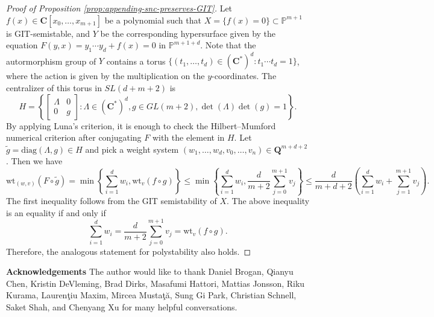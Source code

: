 \documentclass[letterpaper,11pt]{amsart}
\theoremstyle{plain}
\theoremstyle{definition}
\theoremstyle{remark}
\newcommand{\PP}{\mathbb{P}}
\newcommand{\QQ}{\mathbf{Q}}
\newcommand{\CC}{\mathbf{C}}
\newcommand{\sta}{^{*}}
\begin{document}
    \begin{proof}[Proof of Proposition \ref{prop:appending-snc-preserves-GIT}]
        Let $f(x) \in \CC[x_{0},\ldots, x_{m+1}]$ be a polynomial such that $X = \{ f(x) =0\} \subset \PP^{m+1}$ is GIT-semistable, and $Y$ be the corresponding hypersurface given by the equation $F(y,x) = y_{1}\cdots y_{d} + f(x) = 0$ in $\PP^{m+1+d}$. Note that the autormorphism group of $Y$ contains a torus $\{ (t_{1},\ldots, t_{d})\in (\CC\sta)^{d} : t_{1}\cdots t_{d} = 1\}$, where the action is given by the multiplication on the $y$-coordinates. The centralizer of this torus in $SL(d + m + 2)$ is
        $$ H =  \left\{ \begin{bmatrix} \Lambda & 0 \\ 0 & g \end{bmatrix} : \Lambda \in (\CC\sta)^{d}, g \in GL(m+2), \det(\Lambda) \det(g) = 1 \right\}.$$
        By applying Luna's criterion, it is enough to check the Hilbert--Mumford numerical criterion after conjugating $F$ with the element in $H$. Let $\widetilde{g} = \mathrm{diag} (\Lambda, g) \in H$ and pick a weight system $(w_{1},\ldots, w_{d}, v_{0}, \ldots, v_{n}) \in \QQ^{m+d+2}$. Then we have
        $$ \mathrm{wt}_{(w,v)}(F \circ \widetilde{g}) = \min \left\{ \sum_{i=1}^{d} w_{i} , \mathrm{wt}_{v}(f \circ g) \right\} \leq \min \left\{ \sum_{i=1}^{d} w_{i} , \frac{d}{m+2} \sum_{j=0}^{m+1} v_{j}\right\} \leq \frac{d}{m+d+2} \left( \sum_{i=1}^{d} w_{i} + \sum_{j=1}^{m+1} v_{j} \right).$$
        The first inequality follows from the GIT semistability of $X$. The above inequality is an equality if and only if
        $$ \sum_{i=1}^{d} w_{i} = \frac{d}{m+2} \sum_{j=0}^{m+1} v_{j} = \mathrm{wt}_{v}(f\circ g).$$
        Therefore, the analogous statement for polystability also holds.
    \end{proof}

    \textbf{Acknowledgements} The author would like to thank 
    Daniel Brogan, Qianyu Chen, Kristin DeVleming, Brad Dirks, Masafumi Hattori, Mattias Jonsson, Riku Kurama, Lauren\c{t}iu Maxim, Mircea Musta\c{t}\u{a}, Sung Gi Park, Christian Schnell, Saket Shah, and Chenyang Xu for many helpful conversations.
    
	
	
	
	
\end{document}
